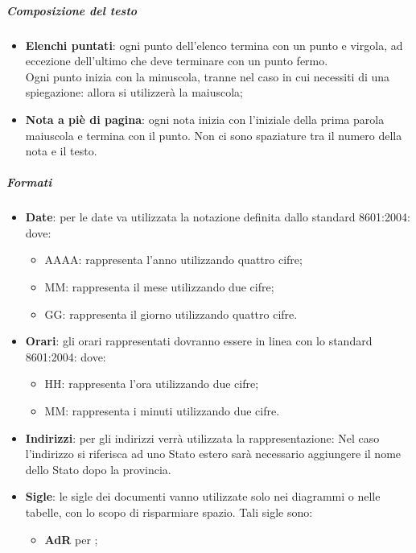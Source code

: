 		\subparagraph{Composizione del testo}
		\label{sec:3.1.2.2.3}
			\begin{itemize}
				\item \textbf{Elenchi puntati}: ogni punto dell'elenco termina con un punto e virgola, ad eccezione dell'ultimo che deve terminare con un punto fermo. \\
				Ogni punto inizia con la minuscola, tranne nel caso in cui necessiti di una spiegazione: allora si utilizzerà la maiuscola;
				\item \textbf{Nota a piè di pagina}: ogni nota inizia con l'iniziale della prima parola maiuscola e termina con il punto. Non ci sono spaziature tra il numero della nota e il testo.
			\end{itemize}
		\subparagraph{Formati}
		\label{sec:3.1.2.2.4}
			\begin{itemize}
				\item \textbf{Date}: per le date va utilizzata la notazione definita dallo standard  8601:2004:
				dove:
				\begin{itemize}
					\item AAAA: rappresenta l'anno utilizzando quattro cifre;
					\item MM: rappresenta il mese utilizzando due cifre;
					\item GG: rappresenta il giorno utilizzando quattro cifre.
				\end{itemize}
				\item \textbf{Orari}: gli orari rappresentati dovranno essere in linea con lo standard  8601:2004:
				dove:
				\begin{itemize}
					\item HH: rappresenta l'ora utilizzando due cifre;
					\item MM: rappresenta i minuti utilizzando due cifre.
				\end{itemize}
				\item \textbf{Indirizzi}: per gli indirizzi verrà utilizzata la rappresentazione:
				Nel caso l'indirizzo si riferisca ad uno Stato estero sarà necessario aggiungere il nome dello Stato dopo la provincia.	
				\item \textbf{Sigle}: le sigle dei documenti vanno utilizzate solo nei diagrammi o nelle tabelle, con lo scopo di risparmiare spazio. Tali sigle sono:
				\begin{itemize}
					\item \textbf{AdR} per \ARdoc;

\end{itemize}
\end{itemize}
